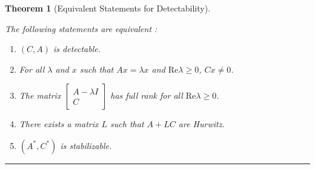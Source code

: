 \documentclass[
]{book}
\newtheorem{theorem}{Theorem}[chapter]
\theoremstyle{definition}
\theoremstyle{definition}
\theoremstyle{definition}
\theoremstyle{definition}
\theoremstyle{remark}
\begin{document}
\begin{theorem}[Equivalent Statements for Detectability]
\protect\hypertarget{thm:ltidetectable}{}\label{thm:ltidetectable}

The following statements are equivalent \citep{zhou1996book-robust}:

\begin{enumerate}
\def\labelenumi{\arabic{enumi}.}
\item
  \((C,A)\) is detectable.
\item
  For all \(\lambda\) and \(x\) such that \(A x = \lambda x\) and \(\text{Re} \lambda \ge 0\), \(C x \ne 0\).
\item
  The matrix \(\begin{bmatrix} A - \lambda I \\ C \end{bmatrix}\) has full rank for all \(\text{Re} \lambda \ge 0\).
\item
  There exists a matrix \(L\) such that \(A+LC\) are Hurwitz.
\item
  \((A^*, C^*)\) is stabilizable.
\end{enumerate}

\end{theorem}

\begin{center}\rule{0.5\linewidth}{0.5pt}\end{center}

  
\end{document}
